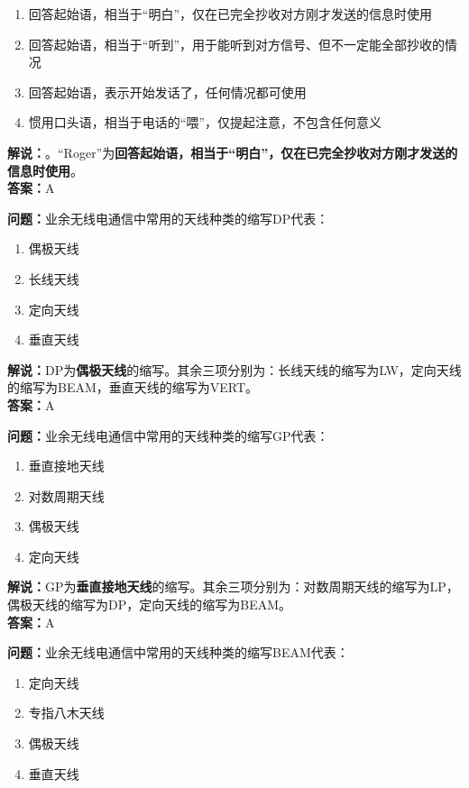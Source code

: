 \begin{enumerate}[label=\Alph*), leftmargin=1.5cm]
	\item 回答起始语，相当于“明白”，仅在已完全抄收对方刚才发送的信息时使用
	\item 回答起始语，相当于“听到”，用于能听到对方信号、但不一定能全部抄收的情况
	\item 回答起始语，表示开始发话了，任何情况都可使用
	\item 惯用口头语，相当于电话的“喂”，仅提起注意，不包含任何意义
\end{enumerate}

\textbf{解说：}。“Roger”为\textbf{回答起始语，相当于“明白”，仅在已完全抄收对方刚才发送的信息时使用}。\\\textbf{答案：}A



\textbf{问题：}业余无线电通信中常用的天线种类的缩写DP代表：

\begin{enumerate}[label=\Alph*), leftmargin=1.5cm]
	\item 偶极天线
	\item 长线天线
	\item 定向天线
	\item 垂直天线
\end{enumerate}

\textbf{解说：}DP为\textbf{偶极天线}的缩写。其余三项分别为：长线天线的缩写为LW，定向天线的缩写为BEAM，垂直天线的缩写为VERT。\\\textbf{答案：}A



\textbf{问题：}业余无线电通信中常用的天线种类的缩写GP代表：

\begin{enumerate}[label=\Alph*), leftmargin=1.5cm]
	\item 垂直接地天线
	\item 对数周期天线
	\item 偶极天线
	\item 定向天线
\end{enumerate}

\textbf{解说：}GP为\textbf{垂直接地天线}的缩写。其余三项分别为：对数周期天线的缩写为LP，偶极天线的缩写为DP，定向天线的缩写为BEAM。\\\textbf{答案：}A



\textbf{问题：}业余无线电通信中常用的天线种类的缩写BEAM代表：

\begin{enumerate}[label=\Alph*), leftmargin=1.5cm]
	\item 定向天线
	\item 专指八木天线
	\item 偶极天线
	\item 垂直天线
\end{enumerate}

